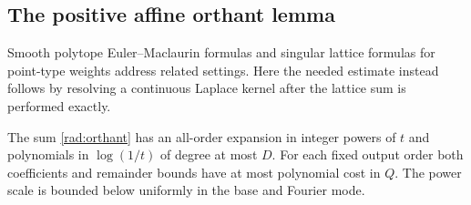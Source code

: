 \subsection{The positive affine orthant lemma}
\label{rad:orthantsec}

Smooth polytope Euler--Maclaurin formulas \cite{BV} and singular
lattice formulas for point-type weights \cite{BK} address related
settings. Here the needed estimate instead follows by resolving
a continuous Laplace kernel after the lattice sum is performed
exactly.

\begin{lemma}\label{rad:lemma}
The sum \eqref{rad:orthant} has an all-order expansion in integer
powers of \(t\) and polynomials in \(\log(1/t)\) of degree at most
\(D\). For each fixed output order both coefficients and remainder
bounds have at most polynomial cost in \(Q\). The power scale is
bounded below uniformly in the base and Fourier mode.
\end{lemma}

